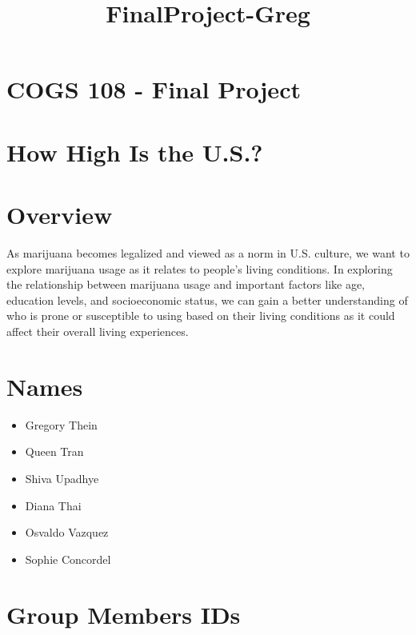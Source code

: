 \documentclass[11pt]{article}
\title{FinalProject-Greg}
\providecommand{\tightlist}{%
      \setlength{\itemsep}{0pt}\setlength{\parskip}{0pt}}
\begin{document}
    
    
    \maketitle
    
    

    
    \section{COGS 108 - Final Project}\label{cogs-108---final-project}

    \section{How High Is the U.S.?}\label{how-high-is-the-u.s.}

    \section{Overview}\label{overview}

    As marijuana becomes legalized and viewed as a norm in U.S. culture, we
want to explore marijuana usage as it relates to people's living
conditions. In exploring the relationship between marijuana usage and
important factors like age, education levels, and socioeconomic status,
we can gain a better understanding of who is prone or susceptible to
using based on their living conditions as it could affect their overall
living experiences.

    \section{Names}\label{names}

\begin{itemize}
\tightlist
\item
  Gregory Thein
\item
  Queen Tran
\item
  Shiva Upadhye
\item
  Diana Thai
\item
  Osvaldo Vazquez
\item
  Sophie Concordel
\end{itemize}

    \section{Group Members IDs}\label{group-members-ids}
\end{document}
